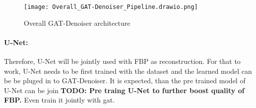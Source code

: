 \begin{figure}[h]
  \centering
  \label{fig:pipeline-overall}
  \texttt{[image: Overall\_GAT-Denoiser\_Pipeline.drawio.png]}
  \caption{Overall GAT-Denoiser architecture}
\end{figure}

\paragraph{U-Net:}
Therefore, U-Net will be jointly used with FBP as reconstruction. For that to work, U-Net needs to be 
first trained with the dataset and the learned model can be be pluged in to GAT-Denoiser.
It is expected, than the pre trained model of U-Net can be join
\textbf{TODO: Pre traing U-Net to further boost quality of FBP.}
Even train it jointly with gat.





